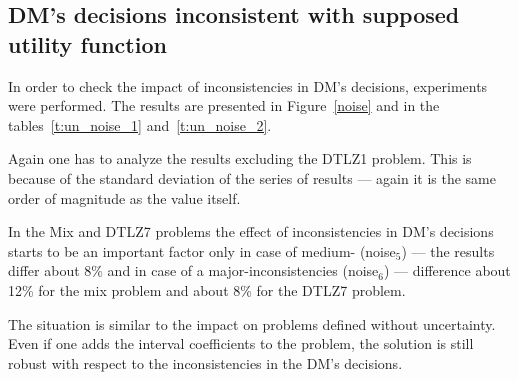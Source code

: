 \clearpage{}

\subsection{DM's decisions inconsistent with supposed utility function}
\label{noise-dm2}


In order to check the impact of inconsistencies in DM's decisions, experiments
were performed. The results are presented in Figure~\ref{noise} and in the
tables~\ref{t:un_noise_1} and~\ref{t:un_noise_2}.

Again one has to analyze the results excluding the DTLZ1 problem. This is
because of the standard deviation of the series of results --- again it is the
same order of magnitude as the value itself.

In the Mix and DTLZ7 problems the effect of inconsistencies in DM's decisions
starts to be an important factor only in case of medium- (noise$_5$) --- the
results differ about $8\%$ and in case of a major-inconsistencies (noise$_6$)
--- difference about 12\% for the mix problem and about 8\% for the DTLZ7
problem.

The situation is similar to the impact on problems defined without
uncertainty. Even if one adds the interval coefficients to the problem, the
solution is still robust with respect to the inconsistencies in the DM's decisions.


